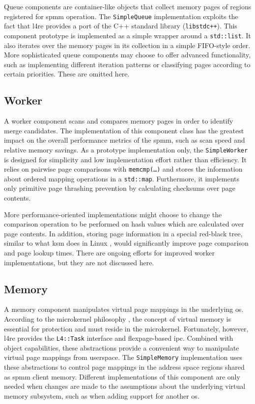 Queue components are container-like objects that collect memory pages of regions registered for \ac{spmm} operation.
The \texttt{SimpleQueue} implementation exploits the fact that \ac{l4re} provides a port of the C++ standard library (\texttt{libstdc++}).
This component prototype is implemented as a simple wrapper around a \texttt{std::list}.
It also iterates over the memory pages in its collection in a simple FIFO-style order.
More sophisticated queue components may choose to offer advanced functionality, such as implementing different iteration patterns or classifying pages according to certain priorities.
These are omitted here.

\subsection*{Worker}
\label{subsec:worker}

A worker component scans and compares memory pages in order to identify merge candidates.
The implementation of this component class has the greatest impact on the overall performance metrics of the \ac{spmm}, such as scan speed and relative memory savings.
As a prototype implementation only, the \texttt{SimpleWorker} is designed for simplicity and low implementation effort rather than efficiency.
It relies on pairwise page comparisons with \texttt{memcmp(\ldots)} and stores the information about ordered mapping operations in a \texttt{std::map}.
Furthermore, it implements only primitive page thrashing prevention by calculating checksums over page contents.

More performance-oriented implementations might choose to change the comparison operation to be performed on hash values which are calculated over page contents.
In addition, storing page information in a special red-black tree, similar to what \ac{ksm} does in Linux \cite{ksm2009}, would significantly improve page comparison and page lookup times.
There are ongoing efforts for improved worker implementations, but they are not discussed here.

\subsection*{Memory}
\label{subsec:memory}

A memory component manipulates virtual page mappings in the underlying \ac{os}.
According to the microkernel philosophy \cite{liedtke1995}, the concept of virtual memory is essential for protection and must reside in the microkernel.
Fortunately, however, \ac{l4re} provides the \texttt{L4::Task} interface and flexpage-based \ac{ipc}.
Combined with object capabilities, these abstractions provide a convenient way to manipulate virtual page mappings from userspace.
The \texttt{SimpleMemory} implementation uses these abstractions to control page mappings in the address space regions shared as \ac{spmm} client memory.
Different implementations of this component are only needed when changes are made to the assumptions about the underlying virtual memory subsystem, such as when adding support for another \ac{os}.


